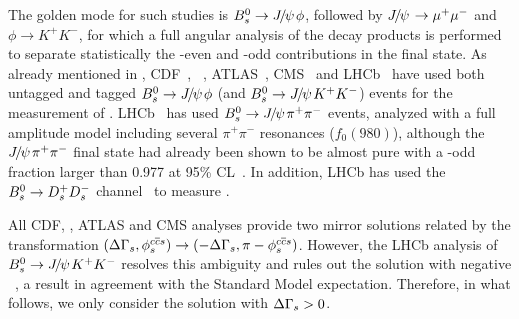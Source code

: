 The golden mode for such studies is 
$B^0_s \to {J\mskip -3mu/\mskip -2mu\psi\mskip 2mu}\phi$, followed by ${J\mskip -3mu/\mskip -2mu\psi\mskip 2mu} \to \mu^+\mu^-$ and 
$\phi\to K^+K^-$, for which a full angular 
analysis of the decay products is performed to 
separate statistically the \CP-even and \CP-odd
contributions in the final state. As already mentioned in 
,
CDF~\cite{Aaltonen:2012ie,*CDF:2011af,*Aaltonen:2007he_mod,*Aaltonen:2007gf_mod},
\dzero~\cite{Abazov:2011ry,*Abazov_mod:2008fj,*Abazov:2007tx_mod_cont},
ATLAS~\cite{Aad:2014cqa,*Aad:2012kba_cont}, CMS~\cite{CMS-PAS-BPH-13-012}
and LHCb~\cite{Aaij:2014zsa,*Aaij:2013oba_supersede2}
have used both untagged and tagged $B^0_s \to {J\mskip -3mu/\mskip -2mu\psi\mskip 2mu}\phi$ (and $B^0_s \to {J\mskip -3mu/\mskip -2mu\psi\mskip 2mu} K^+K^-$) events 
for the measurement of \phiccbars.
LHCb~\cite{Aaij:2014dka,*Aaij:2013oba_supersede}
has used $B^0_s \to {J\mskip -3mu/\mskip -2mu\psi\mskip 2mu} \pi^+\pi^-$ events, 
analyzed with a full amplitude model
including several $\pi^+\pi^-$ resonances (\eg $f_0(980)$),
although the
${J\mskip -3mu/\mskip -2mu\psi\mskip 2mu} \pi^+\pi^-$ final state had already been shown
to be almost \CP pure with a \CP-odd fraction
larger than 0.977 at 95\% CL~\cite{LHCb:2012ae}. 
In addition, LHCb has used the $B^0_s \to D^+_sD^-_s$ channel~\cite{Aaij:2014ywt} to measure \phiccbars.

All CDF, \dzero, ATLAS and CMS analyses provide 
two mirror solutions related by the transformation 
$(\DGs, \phiccbars) \to (-\DGs, \pi-\phiccbars)$. However, the
LHCb analysis of $B^0_s \to {J\mskip -3mu/\mskip -2mu\psi\mskip 2mu} K^+K^-$ resolves this ambiguity and 
rules out the solution with negative \DGs~\cite{Aaij:2012eq},
a result in agreement with the Standard Model expectation.
Therefore, in what follows, we only consider the solution with $\Delta\Gamma_{s} > 0$.


